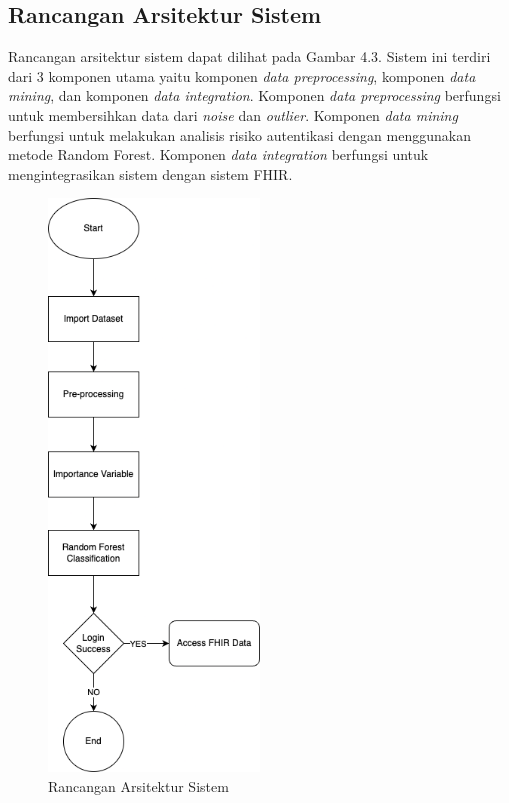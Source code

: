 \subsection{Rancangan Arsitektur Sistem}
Rancangan arsitektur sistem dapat dilihat pada Gambar 4.3. Sistem ini terdiri dari 3 komponen utama yaitu komponen \textit{data preprocessing}, komponen \textit{data mining}, dan komponen \textit{data integration}. Komponen \textit{data preprocessing} berfungsi untuk membersihkan data dari \textit{noise} dan \textit{outlier}. Komponen \textit{data mining} berfungsi untuk melakukan analisis risiko autentikasi dengan menggunakan metode Random Forest. Komponen \textit{data integration} berfungsi untuk mengintegrasikan sistem dengan sistem FHIR.

\begin{figure}[H]
    \centering
    \includegraphics[width=0.5\textwidth]{contents/chapter-4/diagram-khusus.png}
    \caption{Rancangan Arsitektur Sistem}
    \label{fig:arsitektur-sistem}
\end{figure}

